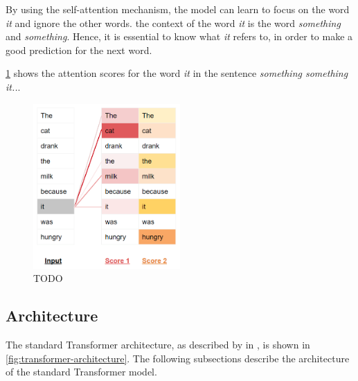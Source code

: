 By using the self-attention mechanism, the model can learn to focus on the word \textit{it} and ignore the other words. the context of the word \textit{it} is the word \textit{something} and \textit{something}. Hence, it is essential to know what \textit{it} refers to, in order to make a good prediction for the next word.

\cref{fig:attention-scores-example} shows the attention scores for the word \textit{it} in the sentence \textit{something something it..}.

\begin{figure}[htp]
    \centering
    \includegraphics[width=0.5\textwidth]{figures/attention-scores-example.png}
    \caption{TODO}
    \label{fig:attention-scores-example}
\end{figure}


\subsection{Architecture}
\label{sec:transformer-architecture}
The standard Transformer architecture, as described by \textcite{vaswani2017attention} in \citeyear{vaswani2017attention}, is shown in \cref{fig:transformer-architecture}. The following subsections describe the architecture of the standard Transformer model.

